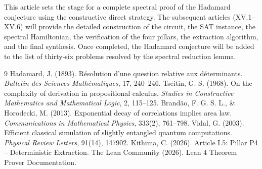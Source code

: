 \documentclass[11pt,a4paper]{article}
\begin{document}
This article sets the stage for a complete spectral proof of the Hadamard conjecture using the constructive direct strategy. The subsequent articles (XV.1–XV.6) will provide the detailed construction of the circuit, the SAT instance, the spectral Hamiltonian, the verification of the four pillars, the extraction algorithm, and the final synthesis. Once completed, the Hadamard conjecture will be added to the list of thirty‑six problems resolved by the spectral reduction lemma.


\begin{thebibliography}{9}
  Hadamard, J. (1893). Résolution d'une question relative aux déterminants. \emph{Bulletin des Sciences Mathématiques}, 17, 240–246.
  Tseitin, G. S. (1968). On the complexity of derivation in propositional calculus. \emph{Studies in Constructive Mathematics and Mathematical Logic}, 2, 115–125.
  Brandão, F. G. S. L., \& Horodecki, M. (2013). Exponential decay of correlations implies area law. \emph{Communications in Mathematical Physics}, 333(2), 761–798.
  Vidal, G. (2003). Efficient classical simulation of slightly entangled quantum computations. \emph{Physical Review Letters}, 91(14), 147902.
  Kithima, C. (2026). Article I.5: Pillar P4 – Deterministic Extraction.
  The Lean Community (2026). Lean 4 Theorem Prover Documentation.
\end{thebibliography}
\end{document}
